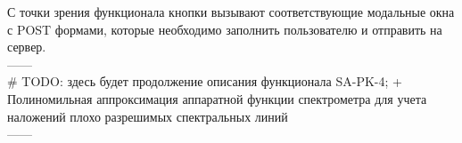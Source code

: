 С точки зрения функционала кнопки вызывают соответствующие модальные окна с POST формами, которые необходимо заполнить
пользователю и отправить на сервер. \\[10mm]
------ \\
# TODO: здесь будет продолжение описания функционала SA-PK-4; + Полиномильная аппроксимация аппаратной
функции спектрометра для учета наложений плохо разрешимых спектральных линий \\
------ \\






















